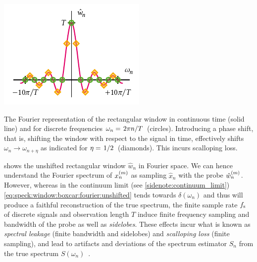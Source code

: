 \begin{marginfigure}
    \centering
    \includegraphics{img/pdf/spectrometer/rect}
    \caption[]{
        The Fourier representation of the rectangular window in continuous time (solid line) and for discrete frequencies $\omega_n = \flatfrac{2\pi n}{T}$ (circles).
        Introducing a phase shift, that is, shifting the window with respect to the signal in time, effectively shifts $\omega_n \to \omega_{n+\eta}$ as indicated for $\eta=\flatfrac{1}{2}$ (diamonds).
        This incurs scalloping loss.
    }
    \label{fig:speck:boxcar_fourier}
\end{marginfigure}

 shows the unshifted rectangular window $\hat{w}_n$ in Fourier space.
We can hence understand the Fourier spectrum of $x_n^{(m)}$ as sampling $\hat{x}_n$ with the probe $\hat{w}_n^{(m)}$.
However, whereas in the continuum limit (see \cref{sidenote:continuum_limit}) \cref{eq:speck:window:boxcar:fourier:unshifted} tends towards $\delta(\omega_n)$ and thus will produce a faithful reconstruction of the true spectrum, the finite sample rate $f_{\mathrm{s}}$ of discrete signals and observation length $T$ induce finite frequency sampling and bandwidth of the probe as well as \emph{sidelobes}.
These effects incur what is known as \emph{spectral leakage} (finite bandwidth and sidelobes) and \emph{scalloping loss} (finite sampling), and lead to artifacts and deviations of the spectrum estimator $S_n$ from the true spectrum $S(\omega_n)$~\cite{Harris1978,Koopmans1995}.

